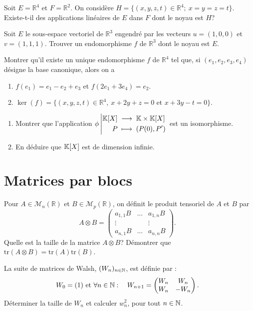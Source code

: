 \documentclass{book}
\begin{document}
\begin{Exercice}
Soit $E=\mathbb R^4$ et $F=\mathbb R^2$. On considère
$H=\{(x,y,z,t)\in\mathbb R^4;\ x=y=z=t\}$. Existe-t-il des applications linéaires de $E$ dans $F$
dont le noyau est $H$?
\end{Exercice}

\begin{Exercice}
Soit $E$ le sous-espace vectoriel de $\mathbb R^3$ engendré par les vecteurs
$u=(1,0,0)$ et $v=(1,1,1)$. Trouver un endomorphisme $f$ de $\mathbb R^3$ dont le noyau est $E$.
\end{Exercice}

\begin{Exercice}
Montrer qu'il existe un unique endomorphisme $f$ de $\mathbb R^4$ tel que, si 
$(e_1,e_2,e_3,e_4)$ désigne la base canonique, alors on a
\begin{enumerate}
\item $f(e_1)=e_1-e_2+e_3$ et $f(2e_1+3e_4)=e_2$.
\item $\ker(f)=\{(x,y,z,t)\in\mathbb R^4,\ x+2y+z=0\textrm{ et }x+3y-t=0\}.$
\end{enumerate}
\end{Exercice}

\begin{Exercice}
\begin{enumerate}
\item Montrer que l'application ${\phi}\left|\begin{aligned}{\mathbb{K}[X]}&\;\longrightarrow\;{\mathbb{K}\times\mathbb{K}[X]}\\{P}&\;\longmapsto\;{(P(0),P')}\end{aligned}\right.$ est un isomorphisme.
\item En déduire que $\mathbb{K}[X]$ est de dimension infinie. 
\end{enumerate}
\end{Exercice}


\section{Matrices par blocs}
\begin{Exercice}
Pour $A\in\mathcal M_n(\mathbb R)$ et $B\in\mathcal M_p(\mathbb R)$, on définit le produit tensoriel de $A$ et $B$ par 
$$A\otimes B=\left(\begin{array}{ccc}
a_{1,1}B&\dots&a_{1,n}B\\
\vdots&&\vdots\\
a_{n,1}B&\dots&a_{n,n}B
\end{array}\right).$$
Quelle est la taille de la matrice $A\otimes B$? Démontrer que $\textrm{tr}(A\otimes B)=\textrm{tr}(A)\textrm{tr}(B)$.
\end{Exercice}
\begin{Exercice}
La suite de matrices de Walsh, $(W_n)_{n\in\mathbb{N}}$, est définie par :
$$W_0=(1)\text{ et }\forall n\in\mathbb{N}:\quad W_{n+1}=\begin{pmatrix}W_n & W_n\\W_n &-W_n
\end{pmatrix}.$$ 
Déterminer la taille de $W_n$ et calculer $w_n^2$, pour tout $n\in\mathbb{N}$.
\end{Exercice}
\end{document}
